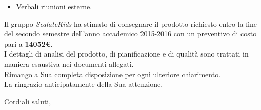 \documentclass[10pt,a4paper]{letter} %
\begin{document}
\begin{letter}{}
\begin{itemize}
\begin{itemize}
    \item Verbali riunioni esterne.
    \end{itemize}
  \end{itemize}
  Il gruppo \textit{ScalateKids} ha stimato di consegnare il prodotto richiesto entro la fine del secondo semestre dell'anno accademico 2015-2016
  con un preventivo di costo pari a \textbf{14052\euro{}}.\\
  I dettagli di analisi del prodotto, di pianificazione e di qualità sono trattati in maniera esaustiva nei documenti allegati.\\
  Rimango a Sua completa disposizione per ogni ulteriore chiarimento.\\
  La ringrazio anticipatamente della Sua attenzione.
  \closing{Cordiali saluti,}

\end{letter}
\end{document}
